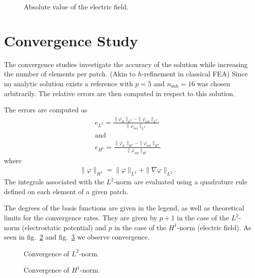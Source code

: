 \begin{center}
\begin{figure}[H]
  
  \caption{Absolute value of the electric field.}
  \label{fig:electric_field}
\end{figure}
\end{center}

\section{Convergence Study}
The convergence studies investigate the accuracy of the solution while increasing the number of elements per patch. (Akin to $h$-refinement in classical FEA) Since no analytic solution exists a reference with $p=5$ and $n_\mathrm{sub}=16$ was chosen arbitrarily. The relative errors are then computed in respect to this solution.

The errors are computed as
\begin{align}
  e_{L^2} = \frac{\| \varphi_\mathrm{it} \|_{L^2} - \| \varphi_\mathrm{ref} \|_{L^2}}{\| \varphi_\mathrm{ref} \|_{L^2}}\\
  \mathrm{and}\\
  e_{H^1} = \frac{\| \varphi_\mathrm{it} \|_{H^1} - \| \varphi_\mathrm{ref} \|_{H^1}}{\| \varphi_\mathrm{ref} \|_{H^1}}
\end{align}
where
\begin{align}
  \| \varphi \|_{H^1} = \| \varphi \|_{L^2} + \| \nabla\varphi \|_{L^2}.
\end{align}
The integrals associated with the $L^2$-norm are evaluated using a quadrature rule defined on each element of a given patch.

The degrees of the basis functions are given in the legend, as well as theoretical limits for the convergence rates. They are given by $p+1$ in the case of the $L^2$-norm (electrostatic potential) and $p$ in the case of the $H^1$-norm (electric field). As seen in fig.~\ref{fig:convergence_potential} and fig.~\ref{fig:convergence_gradient} we observe convergence.

\begin{figure}[H]
  
  \caption{Convergence of $L^2$-norm.}
  \label{fig:convergence_potential}
\end{figure}

\begin{figure}[H]
  
  \caption{Convergence of $H^1$-norm.}
  \label{fig:convergence_gradient}
\end{figure}

